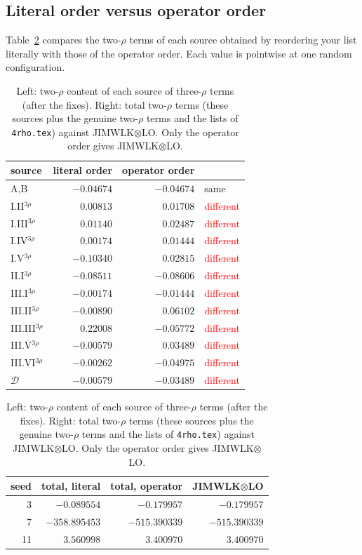 \documentclass[10pt]{article}
\numberwithin{equation}{section}
\begin{document}
\subsection{Literal order versus operator order}
Table~\ref{tab:literal} compares the two-$\rho$ terms of each source obtained by reordering your list literally with those of the operator order. Each value is pointwise at one random configuration.
\begin{table}[H]
\centering\small
\begin{tabular}{@{}l r r l@{}}
source & literal order & operator order & \\ \hline
A,B & $-0.04674$ & $-0.04674$ & same\\
I.II$^{3\rho}$ & $0.00813$ & $0.01708$ & \textcolor{red}{different}\\
I.III$^{3\rho}$ & $0.01140$ & $0.02487$ & \textcolor{red}{different}\\
I.IV$^{3\rho}$ & $0.00174$ & $0.01444$ & \textcolor{red}{different}\\
I.V$^{3\rho}$ & $-0.10340$ & $0.02815$ & \textcolor{red}{different}\\
II.I$^{3\rho}$ & $-0.08511$ & $-0.08606$ & \textcolor{red}{different}\\
III.I$^{3\rho}$ & $-0.00174$ & $-0.01444$ & \textcolor{red}{different}\\
III.II$^{3\rho}$ & $-0.00890$ & $0.06102$ & \textcolor{red}{different}\\
III.III$^{3\rho}$ & $0.22008$ & $-0.05772$ & \textcolor{red}{different}\\
III.V$^{3\rho}$ & $-0.00579$ & $0.03489$ & \textcolor{red}{different}\\
III.VI$^{3\rho}$ & $-0.00262$ & $-0.04975$ & \textcolor{red}{different}\\
$\mathcal D$ & $-0.00579$ & $-0.03489$ & \textcolor{red}{different}\\
\end{tabular}\qquad
\begin{tabular}{@{}r r r r@{}}
seed & total, literal & total, operator & JIMWLK$\otimes$LO\\ \hline
3 & $-0.089554$ & $-0.179957$ & $-0.179957$\\
7 & $-358.895453$ & $-515.390339$ & $-515.390339$\\
11 & $3.560998$ & $3.400970$ & $3.400970$\\
\end{tabular}
\caption{Left: two-$\rho$ content of each source of three-$\rho$ terms (after the fixes). Right: total two-$\rho$ terms (these sources plus the genuine two-$\rho$ terms and the lists of \texttt{4rho.tex}) against JIMWLK$\otimes$LO. Only the operator order gives JIMWLK$\otimes$LO.}
\label{tab:literal}
\end{table}
\end{document}
